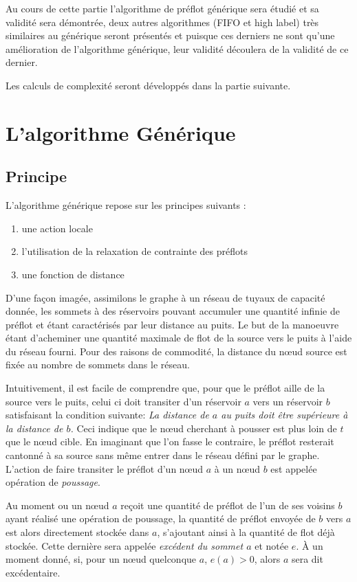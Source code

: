 Au cours de cette partie l'algorithme de préflot générique sera étudié et sa validité sera
démontrée, deux autres algorithmes (FIFO et high label) très similaires au générique seront
présentés et puisque ces derniers ne sont qu'une amélioration de l'algorithme générique, leur
validité découlera de la validité de ce dernier.

Les calculs de complexité seront développés dans la partie suivante.

\section{L'algorithme Générique}

\subsection{Principe}

L'algorithme générique repose sur les principes suivants :
\begin{enumerate}
	\item une action locale
	\item l'utilisation de la relaxation de contrainte des préflots
	\item une fonction de distance
\end{enumerate}

D'une façon imagée, assimilons le graphe à un réseau de tuyaux de capacité donnée, les sommets à des
réservoirs pouvant accumuler une quantité infinie de préflot et étant caractérisés par leur distance au
puits. Le but de la manoeuvre étant d'acheminer une quantité maximale de flot de la source vers le
puits à l'aide du réseau fourni. Pour des raisons de commodité, la distance du n\oe ud source est fixée
au nombre de sommets dans le réseau. 

Intuitivement, il est facile de comprendre que, pour que le préflot aille de la source vers le puits,
celui ci doit transiter d'un réservoir $a$ vers un réservoir $b$ satisfaisant la condition suivante:
\emph{La distance de $a$ au puits doit être supérieure à la distance de $b$.} Ceci indique que le
n\oe ud cherchant à pousser est plus loin de $t$ que le n\oe ud cible.  En imaginant que l'on
fasse le contraire, le préflot resterait cantonné à sa source sans même entrer dans le réseau défini
par le graphe. L'action de faire transiter le préflot d'un n\oe ud $a$ à un n\oe ud $b$ est appelée
opération de \emph{poussage}.

Au moment ou un n\oe ud $a$ reçoit une quantité de préflot de l'un de ses voisins $b$ ayant réalisé une
opération de poussage, la quantité de préflot envoyée de $b$ vers $a$ est alors directement stockée
dans $a$, s'ajoutant ainsi à la quantité de flot déjà stockée. Cette dernière sera appelée
\emph{excédent du sommet $a$} et notée $e$. À un moment donné, si, pour un n\oe ud quelconque $a$,
$e(a) > 0$, alors $a$ sera dit excédentaire.

